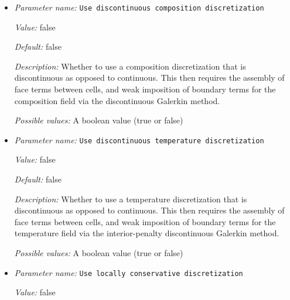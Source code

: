 \begin{itemize}
{\it Description:} The polynomial degree to use for the temperature variable. As an example, a value of 2 for this parameter will yield either the element $Q_2$ or $DGQ_2$ for the temperature field, depending on whether we use a continuous or discontinuous field. Units: None.


{\it Possible values:} An integer $n$ such that $1\leq n \leq 2147483647$
\item {\it Parameter name:} {\tt Use discontinuous composition discretization}
\label{parameters:Discretization/Use discontinuous composition discretization}


{\it Value:} false


{\it Default:} false


{\it Description:} Whether to use a composition discretization that is discontinuous as opposed to continuous. This then requires the assembly of face terms between cells, and weak imposition of boundary terms for the composition field via the discontinuous Galerkin method.


{\it Possible values:} A boolean value (true or false)
\item {\it Parameter name:} {\tt Use discontinuous temperature discretization}
\label{parameters:Discretization/Use discontinuous temperature discretization}


{\it Value:} false


{\it Default:} false


{\it Description:} Whether to use a temperature discretization that is discontinuous as opposed to continuous. This then requires the assembly of face terms between cells, and weak imposition of boundary terms for the temperature field via the interior-penalty discontinuous Galerkin method.


{\it Possible values:} A boolean value (true or false)
\item {\it Parameter name:} {\tt Use locally conservative discretization}
\label{parameters:Discretization/Use locally conservative discretization}


{\it Value:} false



\end{itemize}
